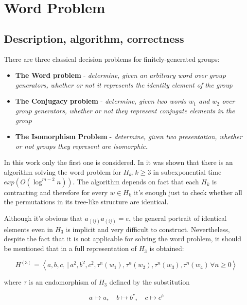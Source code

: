 \documentclass[a4paper,12pt]{amsart}
\begin{document}
\section{Word Problem}

\subsection{Description, algorithm, correctness}

There are three classical decision problems for finitely-generated groups: 

\begin{itemize}
	\item \textbf{The Word problem} - \textit{determine, given an arbitrary word over group generators, whether or not it represents the identity element of the group}
	
	\item \textbf{The Conjugacy problem} - \textit{determine, given two words $w_1$ and $w_2$ over group generators, whether or not they represent conjugate elements in the group}
	
	\item \textbf{The Isomorphism Problem} - \textit{determine, given two presentation, whether or not groups they represent are isomorphic.}
\end{itemize}


In this work only the first one is considered. In \cite{Bond} it was shown that there is an algorithm solving the word problem for $H_k, k \ge 3$ in subexponential time $exp(O(\log^{m-2}n))$. The algorithm depends on fact that each $H_k$ is contracting and therefore for every $w \in H_k$ it's enough just to check whether all the permutations in its tree-like structure are identical.

Although it's obvious that $a_{(ij)}a_{(ij)} = e$, the general portrait of identical elements even in $H_3$ is implicit and very difficult to construct. Nevertheless, despite the fact that it is not applicable for solving the word problem, it should be mentioned that in \cite{HRepr} a full representation of $H_3$ is obtained: 

$$ H^{(3)} = \left\langle
a, b, c,\, |\, a^2, b^2, c^2, \tau^n(w_1), \tau^n(w_2), \tau^n(w_3), \tau^n(w_4) \, \forall n \ge 0
\right\rangle $$

where $\tau$ is an endomorphism of $H_3$ defined by the substitution

$$ a \mapsto a, \quad b \mapsto b^c, \quad c \mapsto c^b$$
\end{document}
